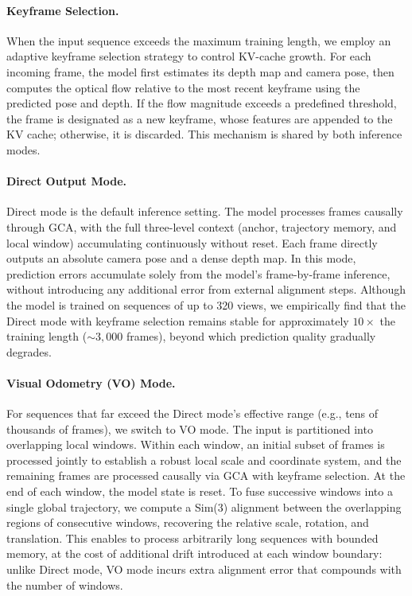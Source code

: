 \paragraph{Keyframe Selection.}
When the input sequence exceeds the maximum training length, we
employ an adaptive keyframe selection strategy to control KV-cache
growth.
For each incoming frame, the model first estimates its depth map and
camera pose, then computes the optical flow relative to the most
recent keyframe using the predicted pose and depth.
If the flow magnitude exceeds a predefined threshold, the frame is
designated as a new keyframe, whose features are appended to the
KV cache; otherwise, it is discarded.
This mechanism is shared by both inference modes.

\paragraph{Direct Output Mode.}
Direct mode is the default inference setting.
The model processes frames causally through GCA, with the full
three-level context (anchor, trajectory memory, and local window)
accumulating continuously without reset.
Each frame directly outputs an absolute camera pose and a dense
depth map.
In this mode, prediction errors accumulate solely from the model's
frame-by-frame inference, without introducing any additional error
from external alignment steps.
Although the model is trained on sequences of up to 320 views, we
empirically find that the Direct mode with keyframe selection remains
stable for approximately $10\times$ the training length
(${\sim}3{,}000$ frames), beyond which prediction quality gradually
degrades.

\paragraph{Visual Odometry (VO) Mode.}
For sequences that far exceed the Direct mode's effective range
(e.g., tens of thousands of frames), we switch to VO mode.
The input is partitioned into overlapping local windows.
Within each window, an initial subset of frames is processed jointly
to establish a robust local scale and coordinate system, and the
remaining frames are processed causally via GCA with keyframe
selection.
At the end of each window, the model state is reset.
To fuse successive windows into a single global trajectory, we
compute a Sim(3) alignment between the overlapping regions of
consecutive windows, recovering the relative scale, rotation, and
translation.
This enables \method to process arbitrarily long sequences with
bounded memory, at the cost of additional drift introduced at each
window boundary: unlike Direct mode, VO mode incurs extra alignment
error that compounds with the number of windows.

